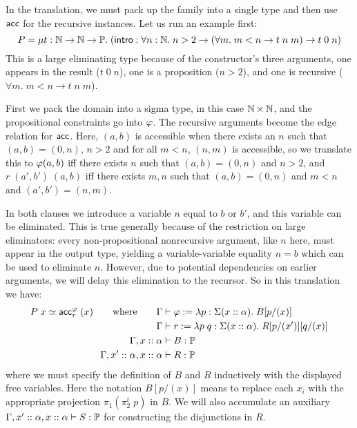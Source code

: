 In the translation, we must pack up the family into a single type and then use $\mathsf{acc}$ for the recursive instances. Let us run an example first:
$$P=\mu t:\mathbb{N}\to\mathbb{N}\to\mathbb{P}.\;(\mathsf{intro}:\forall n:\mathbb{N}.\;n>2\to (\forall m.\;m<n\to t\;n\;m)\to t\;0\;n)$$
This is a large eliminating type because of the constructor's three arguments, one appears in the result ($t\;0\;n$), one is a proposition ($n>2$), and one is recursive ($\forall m.\;m<n\to t\;n\;m$).

First we pack the domain into a sigma type, in this case $\mathbb{N}\times\mathbb{N}$, and the propositional constraints go into $\varphi$. The recursive arguments become the edge relation for $\mathsf{acc}$. Here, $(a,b)$ is accessible when there exists an $n$ such that $(a,b)=(0,n)$, $n>2$ and for all $m<n$, $(n,m)$ is accessible, so we translate this to $\varphi(a,b)$ iff there exists $n$ such that $(a,b)=(0,n)$ and $n>2$, and $r\;(a',b')\;(a,b)$ iff there exists $m,n$ such that $(a,b)=(0,n)$ and $m<n$ and $(a',b')=(n,m)$.

In both clauses we introduce a variable $n$ equal to $b$ or $b'$, and this variable can be eliminated. This is true generally because of the restriction on large eliminators: every non-propositional nonrecursive argument, like $n$ here, must appear in the output type, yielding a variable-variable equality $n=b$ which can be used to eliminate $n$. However, due to potential dependencies on earlier arguments, we will delay this elimination to the recursor. So in this translation we have:
\begin{align*}
P\;x\simeq\acc_r^\vph\;(x)\qquad\mbox{where}\qquad\Gamma&\vdash \vph:=\lambda p:\Sigma(x::\alpha).\; B[p/(x)]\\
\Gamma&\vdash r:=\lambda p\;q:\Sigma(x::\alpha).\;R[p/(x')][q/(x)]\\
\Gamma,x::\alpha&\vdash B:\P\\
\Gamma,x'::\alpha,x::\alpha&\vdash R:\P
\end{align*}
where we must specify the definition of $B$ and $R$ inductively with the displayed free variables. Here the notation $B[p/(x)]$ means to replace each $x_i$ with the appropriate projection $\pi_1(\pi_2^i\;p)$ in $B$. We will also accumulate an auxiliary $\Gamma,x'::\alpha,x::\alpha\vdash S:\P$ for constructing the disjunctions in $R$.

